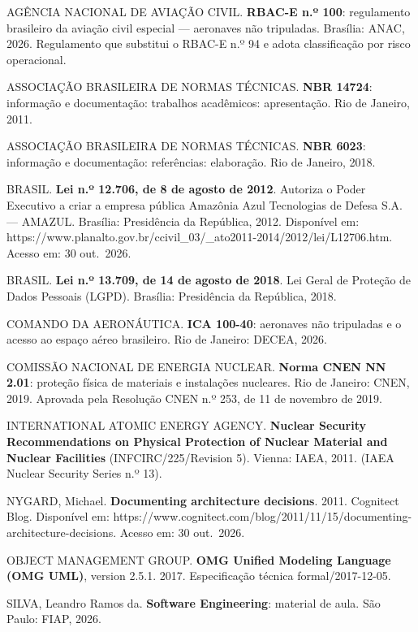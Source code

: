 \documentclass[12pt,a4paper,oneside]{article}
\begin{document}
{\singlespacing\raggedright
\setlength{\parindent}{0pt}
\setlength{\parskip}{0.7\baselineskip}

AGÊNCIA NACIONAL DE AVIAÇÃO CIVIL. \textbf{RBAC-E n.º 100}: regulamento
brasileiro da aviação civil especial — aeronaves não tripuladas. Brasília:
ANAC, 2026. Regulamento que substitui o RBAC-E n.º 94 e adota classificação por
risco operacional.

ASSOCIAÇÃO BRASILEIRA DE NORMAS TÉCNICAS. \textbf{NBR 14724}: informação e
documentação: trabalhos acadêmicos: apresentação. Rio de Janeiro, 2011.

ASSOCIAÇÃO BRASILEIRA DE NORMAS TÉCNICAS. \textbf{NBR 6023}: informação e
documentação: referências: elaboração. Rio de Janeiro, 2018.

BRASIL. \textbf{Lei n.º 12.706, de 8 de agosto de 2012}. Autoriza o Poder
Executivo a criar a empresa pública Amazônia Azul Tecnologias de Defesa S.A. —
AMAZUL. Brasília: Presidência da República, 2012. Disponível em:
https://www.planalto.gov.br/ccivil\_03/\_ato2011-2014/2012/lei/L12706.htm.
Acesso em: 30 out.\ 2026.

BRASIL. \textbf{Lei n.º 13.709, de 14 de agosto de 2018}. Lei Geral de Proteção
de Dados Pessoais (LGPD). Brasília: Presidência da República, 2018.

COMANDO DA AERONÁUTICA. \textbf{ICA 100-40}: aeronaves não tripuladas e o
acesso ao espaço aéreo brasileiro. Rio de Janeiro: DECEA, 2026.

COMISSÃO NACIONAL DE ENERGIA NUCLEAR. \textbf{Norma CNEN NN 2.01}: proteção
física de materiais e instalações nucleares. Rio de Janeiro: CNEN, 2019.
Aprovada pela Resolução CNEN n.º 253, de 11 de novembro de 2019.

INTERNATIONAL ATOMIC ENERGY AGENCY. \textbf{Nuclear Security Recommendations on
Physical Protection of Nuclear Material and Nuclear Facilities}
(INFCIRC/225/Revision 5). Vienna: IAEA, 2011. (IAEA Nuclear Security Series
n.º 13).

NYGARD, Michael. \textbf{Documenting architecture decisions}. 2011. Cognitect
Blog. Disponível em:
https://www.cognitect.com/blog/2011/11/15/documenting-architecture-decisions.
Acesso em: 30 out.\ 2026.

OBJECT MANAGEMENT GROUP. \textbf{OMG Unified Modeling Language (OMG UML)},
version 2.5.1. 2017. Especificação técnica formal/2017-12-05.

SILVA, Leandro Ramos da. \textbf{Software Engineering}: material de aula. São
Paulo: FIAP, 2026.

}
\end{document}

